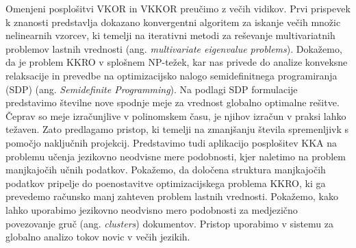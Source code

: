 Omenjeni posplošitvi VKOR in VKKOR preučimo z večih vidikov. Prvi prispevek k znanosti predstavlja
dokazano konvergentni algoritem za iskanje večih množic nelinearnih vzorcev,
ki temelji na iterativni metodi za reševanje multivariatnih problemov lastnih vrednosti (ang.
\emph{multivariate eigenvalue problems}). Dokažemo, da je problem KKRO v splošnem NP-težek,
kar nas privede do analize konveksne relaksacije in prevedbe na optimizacijsko nalogo
semidefinitnega programiranja (SDP) (ang. \emph{Semidefinite Programming}). Na podlagi
SDP formulacije predstavimo številne nove spodnje meje za vrednost globalno optimalne
rešitve. Čeprav so meje izračunjlive v polinomskem času, je njihov izračun v praksi
lahko težaven. Zato predlagamo pristop, ki temelji na zmanjšanju števila spremenljivk s
pomočjo naključnih projekcij. Predstavimo tudi aplikacijo posplošitev KKA na problemu
učenja jezikovno neodvisne mere podobnosti, kjer naletimo na problem manjkajočih
učnih podatkov. Pokažemo, da določena struktura manjkajočih podatkov pripelje do
poenostavitve optimizacijskega problema KKRO, ki ga prevedemo računsko manj zahteven
problem lastnih vrednosti. Pokažemo, kako lahko uporabimo jezikovno neodvisno mero podobnosti
za medjezično povezovanje gruč (ang. \emph{clusters}) dokumentov. Pristop uporabimo v sistemu za globalno analizo
tokov novic v večih jezikih.


